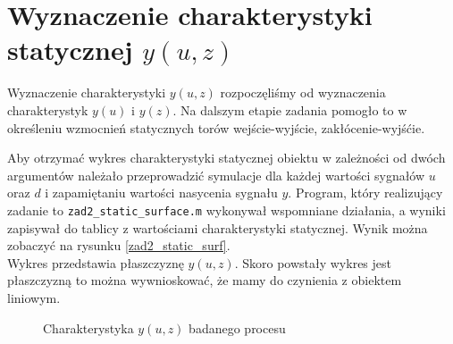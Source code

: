 \section{Wyznaczenie charakterystyki statycznej $y(u,z)$}
Wyznaczenie charakterystyki $y(u,z)$ rozpoczęliśmy od wyznaczenia charakterystyk $y(u)$ i $y(z)$. 
Na dalszym etapie zadania pomogło to w określeniu wzmocnień statycznych torów wejście-wyjście, zakłócenie-wyjśćie. 

Aby otrzymać wykres charakterystyki statycznej obiektu w zależności od 
dwóch argumentów należało przeprowadzić symulacje dla każdej 
wartości sygnałów $u$ oraz $d$ i zapamiętaniu wartości 
nasycenia sygnału $y$. Program, który realizujący zadanie to 
\verb+zad2_static_surface.m+ wykonywał wspomniane działania, 
a wyniki zapisywał do tablicy z wartościami charakterystyki statycznej. 
Wynik można zobaczyć na rysunku \ref{zad2_static_surf}.\\
\indent{} Wykres przedstawia płaszczyznę $y(u,z)$. Skoro powstały wykres 
jest płaszczyzną to można wywnioskować, że mamy do czynienia z obiektem liniowym. 

\begin{figure}[t]
    \centering
    \caption{Charakterystyka $y(u,z)$ badanego procesu}
    \label{zad2_y_od_u_i_z}
\end{figure}